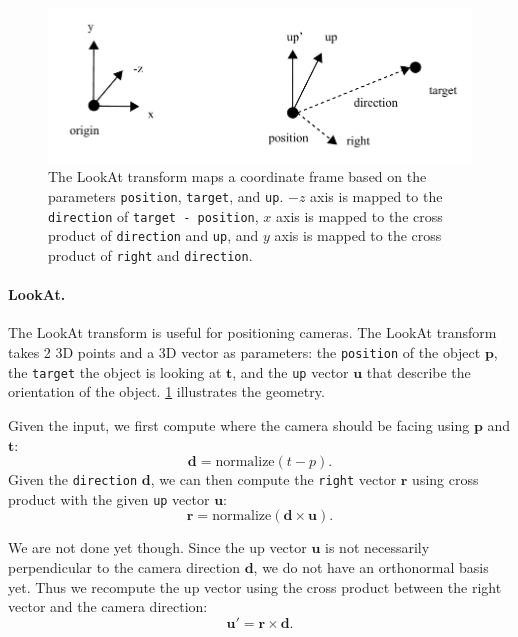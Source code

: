 \begin{figure}[h]
    \centering
    \includegraphics[width=0.7\linewidth]{imgs/lookat.pdf}
    \caption{The LookAt transform maps a coordinate frame based on the parameters \lstinline{position}, \lstinline{target}, and \lstinline{up}. $-z$ axis is mapped to the \lstinline{direction} of \lstinline{target - position}, $x$ axis is mapped to the cross product of \lstinline{direction} and \lstinline{up}, and $y$ axis is mapped to the cross product of \lstinline{right} and \lstinline{direction}.}
    \label{fig:lookat}
\end{figure}


\paragraph{LookAt.} The LookAt transform is useful for positioning cameras. The LookAt transform takes 2 3D points and a 3D vector as parameters: the \lstinline{position} of the object $\mathbf{p}$, the \lstinline{target} the object is looking at $\mathbf{t}$, and the \lstinline{up} vector $\mathbf{u}$ that describe the orientation of the object. \cref{fig:lookat} illustrates the geometry.

Given the input, we first compute where the camera should be facing using $\mathbf{p}$ and $\mathbf{t}$:
\begin{equation}
\mathbf{d} = \text{normalize}(t - p).
\end{equation} 
Given the \lstinline{direction} $\mathbf{d}$, we can then compute the \lstinline{right} vector $\mathbf{r}$ using cross product with the given \lstinline{up} vector $\mathbf{u}$:
\begin{equation}
\mathbf{r} = \text{normalize}\left(\mathbf{d} \times \mathbf{u}\right).
\end{equation}

We are not done yet though. Since the up vector $\mathbf{u}$ is not necessarily perpendicular to the camera direction $\mathbf{d}$, we do not have an orthonormal basis yet. Thus we recompute the up vector using the cross product between the right vector and the camera direction:
\begin{equation}
\mathbf{u}' = \mathbf{r} \times \mathbf{d}.
\end{equation}

